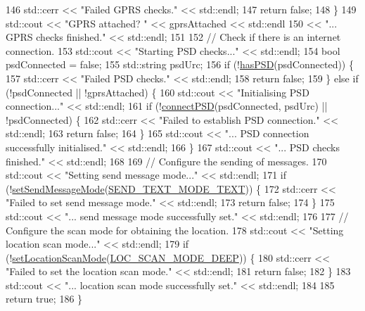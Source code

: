 \begin{DoxyCode}
146         std::cerr << \textcolor{stringliteral}{"Failed GPRS checks."} << std::endl;
147         \textcolor{keywordflow}{return} \textcolor{keyword}{false};
148     \}
149     std::cout << \textcolor{stringliteral}{"GPRS attached? "} << gprsAttached << std::endl
150               << \textcolor{stringliteral}{"... GPRS checks finished."} << std::endl;
151 
152     \textcolor{comment}{// Check if there is an internet connection.}
153     std::cout << \textcolor{stringliteral}{"Starting PSD checks..."} << std::endl;
154     \textcolor{keywordtype}{bool} psdConnected = \textcolor{keyword}{false};
155     std::string psdUrc;
156     \textcolor{keywordflow}{if} (!\hyperlink{class_u_blox_ae49b51a602a327b5eff5b04d2ccaec20}{hasPSD}(psdConnected)) \{
157         std::cerr << \textcolor{stringliteral}{"Failed PSD checks."} << std::endl;
158         \textcolor{keywordflow}{return} \textcolor{keyword}{false};
159     \} \textcolor{keywordflow}{else} \textcolor{keywordflow}{if} (!psdConnected || !gprsAttached) \{
160         std::cout << \textcolor{stringliteral}{"Initialising PSD connection..."} << std::endl;
161         \textcolor{keywordflow}{if} (!\hyperlink{class_u_blox_ac250bd4aea14e09b3a2595c2b8eda18a}{connectPSD}(psdConnected, psdUrc) || !psdConnected) \{
162             std::cerr << \textcolor{stringliteral}{"Failed to establish PSD connection."} << std::endl;
163             \textcolor{keywordflow}{return} \textcolor{keyword}{false};
164         \}
165         std::cout << \textcolor{stringliteral}{"... PSD connection successfully initialised."} << std::endl;
166     \}
167     std::cout << \textcolor{stringliteral}{"... PSD checks finished."} << std::endl;
168 
169     \textcolor{comment}{// Configure the sending of messages.}
170     std::cout << \textcolor{stringliteral}{"Setting send message mode..."} << std::endl;
171     \textcolor{keywordflow}{if} (!\hyperlink{class_u_blox_a12c1042d3bcb503b025927fd53d54243}{setSendMessageMode}(\hyperlink{_u_blox_8h_a4fdc1adf2ea333d6490119160a35401a}{SEND\_TEXT\_MODE\_TEXT})) \{
172         std::cerr << \textcolor{stringliteral}{"Failed to set send message mode."} << std::endl;
173         \textcolor{keywordflow}{return} \textcolor{keyword}{false};
174     \}
175     std::cout << \textcolor{stringliteral}{"... send message mode successfully set."} << std::endl;
176 
177     \textcolor{comment}{// Configure the scan mode for obtaining the location.}
178     std::cout << \textcolor{stringliteral}{"Setting location scan mode..."} << std::endl;
179     \textcolor{keywordflow}{if} (!\hyperlink{class_u_blox_aabed44fd41e16c9d1a8daba80f3bef06}{setLocationScanMode}(\hyperlink{_u_blox_8h_a5c819e4d40995d2854dc0e2cddd7ddef}{LOC\_SCAN\_MODE\_DEEP})) \{
180         std::cerr << \textcolor{stringliteral}{"Failed to set the location scan mode."} << std::endl;
181         \textcolor{keywordflow}{return} \textcolor{keyword}{false};
182     \}
183     std::cout << \textcolor{stringliteral}{"... location scan mode successfully set."} << std::endl;
184 
185     \textcolor{keywordflow}{return} \textcolor{keyword}{true};
186 \}
\end{DoxyCode}

